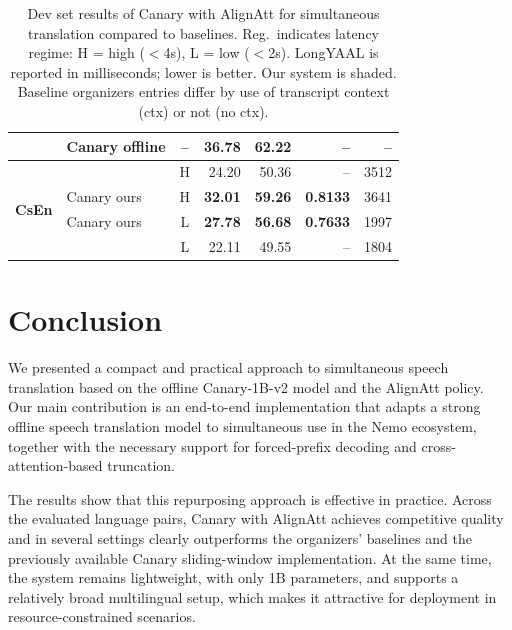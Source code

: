 \documentclass[11pt]{article}
\begin{document}
\begin{table}[t]
\begin{tabular}{ll|c|rrrr}
        & Canary offline & -- & 36.78 & 62.22 & -- & -- \\
        \hline
        \multirow{4}{*}{\textbf{CsEn}}
        & \sswhisper{} & H & 24.20 & 50.36 & -- & 3512 \\
        & \cellcolor{lightgray}Canary ours & \cellcolor{lightgray}H &
          \cellcolor{lightgray}\textbf{32.01} &
          \cellcolor{lightgray}\textbf{59.26} &
          \cellcolor{lightgray}\textbf{0.8133} &
          \cellcolor{lightgray}3641 \\
        & \cellcolor{lightgray}Canary ours & \cellcolor{lightgray}L &
          \cellcolor{lightgray}\textbf{27.78} &
          \cellcolor{lightgray}\textbf{56.68} &
          \cellcolor{lightgray}\textbf{0.7633} &
          \cellcolor{lightgray}1997 \\
        & \sswhisper{} & L & 22.11 & 49.55 & -- & 1804 \\
        \hline
    \end{tabular}
    \caption{Dev set results of Canary with AlignAtt for simultaneous translation compared to baselines. Reg.\ indicates latency regime: H = high ($<$4s), L = low ($<$2s). LongYAAL is reported in milliseconds; lower is better. Our system is shaded. Baseline organizers entries differ by use of transcript context (ctx) or not (no ctx).}
    \label{tab:dev_compare}
\end{table}



\section{Conclusion}

We presented a compact and practical approach to simultaneous speech translation based on the offline Canary-1B-v2 model and the AlignAtt policy. Our main contribution is an end-to-end implementation that adapts a strong offline speech translation model to simultaneous use in the Nemo ecosystem, together with the necessary support for forced-prefix decoding and cross-attention-based truncation.

The results show that this repurposing approach is effective in practice. Across the evaluated language pairs, Canary with AlignAtt achieves competitive quality and in several settings clearly outperforms the organizers' baselines and the previously available Canary sliding-window implementation. At the same time, the system remains lightweight, with only 1B parameters, and supports a relatively broad multilingual setup, which makes it attractive for deployment in resource-constrained scenarios.
\end{document}
